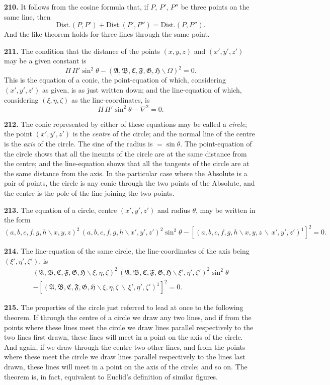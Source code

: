 \documentclass[11pt,a4paper]{book}
\begin{document}
\begin{center}
\textbf{210.} It follows from the cosine formula that, if $P$, $P'$, $P''$ be three points on the
same line, then
\[
\text{Dist.}(P,P') + \text{Dist.}(P',P'') = \text{Dist.}(P,P'').
\]
And the like theorem holds for three lines through the same point.

\textbf{211.} The condition that the distance of the points $(x,y,z)$ and $(x',y',z')$ may be
a given constant is
\[
\Pi\,\Pi'\sin^2\theta - (\mathfrak{A},\mathfrak{B},\mathfrak{C},\mathfrak{F},\mathfrak{G},\mathfrak{H}\!\backslash \Omega)^2 = 0.
\]
This is the equation of a conic, the point-equation of which, considering $(x',y',z')$ as
given, is as just written down; and the line-equation of which, considering $(\xi,\eta,\zeta)$
as the line-coordinates, is
\[
\Pi\,\Pi'\sin^2\theta - \nabla^2 = 0.
\]

\textbf{212.} The conic represented by either of these equations may be called a \textit{circle};
the point $(x',y',z')$ is the \textit{centre} of the circle; and the normal line of the centre is the
\textit{axis} of the circle. The sine of the radius is $=\sin\theta$. The point-equation of the circle
shows that all the ineunts of the circle are at the same distance from the centre; and
the line-equation shows that all the tangents of the circle are at the same distance
from the axis. In the particular case where the Absolute is a pair of points, the circle
is any conic through the two points of the Absolute, and the centre is the pole of the
line joining the two points.

\textbf{213.} The equation of a circle, centre $(x',y',z')$ and radius $\theta$, may be written in
the form
\[
(a,b,c,f,g,h\!\backslash x,y,z)^2\,(a,b,c,f,g,h\!\backslash x',y',z')^2\sin^2\theta
- [(a,b,c,f,g,h\!\backslash x,y,z\,\backslash\,x',y',z')^1]^2 = 0.
\]

\textbf{214.} The line-equation of the same circle, the line-coordinates of the axis being
$(\xi',\eta',\zeta')$, is
\begin{multline*}
(\mathfrak{A},\mathfrak{B},\mathfrak{C},\mathfrak{F},\mathfrak{G},\mathfrak{H}\!\backslash \xi,\eta,\zeta)^2\,(\mathfrak{A},\mathfrak{B},\mathfrak{C},\mathfrak{F},\mathfrak{G},\mathfrak{H}\!\backslash \xi',\eta',\zeta')^2\sin^2\theta\\
- [(\mathfrak{A},\mathfrak{B},\mathfrak{C},\mathfrak{F},\mathfrak{G},\mathfrak{H}\!\backslash \xi,\eta,\zeta\,\backslash\,\xi',\eta',\zeta')^1]^2 = 0.
\end{multline*}

\textbf{215.} The properties of the circle just referred to lead at once to the following
theorem. If through the centre of a circle we draw any two lines, and if from the
points where these lines meet the circle we draw lines parallel respectively to the two
lines first drawn, these lines will meet in a point on the axis of the circle. And again,
if we draw through the centre two other lines, and from the points where these meet
the circle we draw lines parallel respectively to the lines last drawn, these lines will
meet in a point on the axis of the circle; and so on. The theorem is, in fact, equivalent
to Euclid's definition of similar figures.


\end{center}
\end{document}
